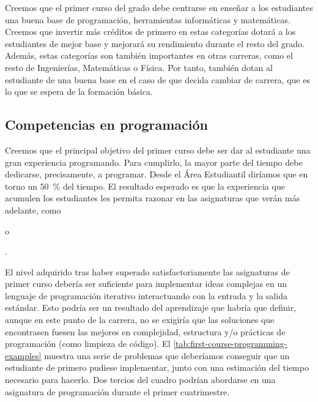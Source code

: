 Creemos que el primer curso del grado debe centrarse en
enseñar a los estudiantes una buena base de
programación,
herramientas informáticas y
matemáticas.
Creemos que invertir más créditos de primero en estas categorías
dotará a los estudiantes de mejor base y
mejorará su rendimiento durante el resto del grado.
Además, estas categorías son también importantes en otras carreras,
como el resto de Ingenierías, Matemáticas o Física.
Por tanto, también dotan al estudiante de una buena base
en el caso de que decida cambiar de carrera,
que es lo que se espera de la formación básica.

\subsection{Competencias en programación}

Creemos que el principal objetivo del primer curso debe ser
dar al estudiante una gran experiencia programando.
Para cumplirlo, la mayor parte del tiempo debe dedicarse,
precisamente, a programar.
Desde el Área Estudiantil diríamos que
en torno un \SI{50}{\percent} del tiempo.
El resultado esperado es que la experiencia que acumulen los estudiantes
les permita razonar en las asignaturas que verán más adelante,
como \subject{Programación Orientada a Objetos} o
\subject{Algoritmos y Estructuras de Datos}\footnotemark.


El nivel adquirido tras
haber superado satisfactoriamente las asignaturas de primer curso
debería ser suficiente para implementar ideas complejas en
un lenguaje de programación iterativo
interactuando con la entrada y la salida estándar.
Esto podría ser un resultado del aprendizaje que habría que definir,
aunque en este punto de la carrera,
no se exigiría que las soluciones que encontrasen fuesen las mejores en
complejidad, estructura y/o prácticas de programación
(como limpieza de código).
El \cref{tab:first-course-programming-examples}
muestra una serie de problemas que deberíamos conseguir que
un estudiante de primero pudiese implementar,
junto con una estimación del tiempo necesario para hacerlo.
Dos tercios del cuadro podrían abordarse en
una asignatura de programación durante el primer cuatrimestre.

